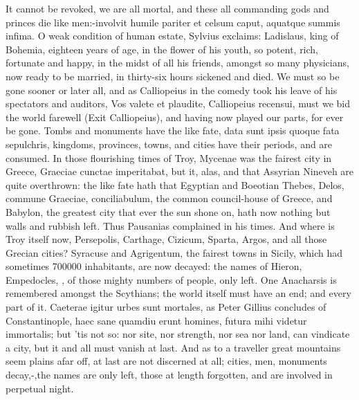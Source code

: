 {It cannot be revoked, we are all mortal, and these all commanding gods
and princes die like men:-involvit humile pariter et celsum
caput, aquatque summis infima. O weak condition of human estate,
Sylvius exclaims: Ladislaus, king of Bohemia, eighteen years of
age, in the flower of his youth, so potent, rich, fortunate and happy,
in the midst of all his friends, amongst so many physicians, now
ready to be  married, in thirty-six hours sickened and died. We
must so be gone sooner or later all, and as Calliopeius in the comedy
took his leave of his spectators and auditors, Vos valete et plaudite,
Calliopeius recensui, must we bid the world farewell (Exit
Calliopeius), and having now played our parts, for ever be gone. Tombs
and monuments have the like fate, data sunt ipsis quoque fata
sepulchris, kingdoms, provinces, towns, and cities have their periods,
and are consumed. In those flourishing times of Troy, Mycenae was the
fairest city in Greece, Graeciae cunctae imperitabat, but it, alas, and
that Assyrian Nineveh are quite overthrown: the like fate hath
that Egyptian and Boeotian Thebes, Delos, commune Graeciae,
conciliabulum, the common council-house of Greece, and Babylon,
the greatest city that ever the sun shone on, hath now nothing but
walls and rubbish left.  Thus Pausanias complained in his times. And where is
Troy itself now, Persepolis, Carthage, Cizicum, Sparta, Argos, and all
those Grecian cities? Syracuse and Agrigentum, the fairest towns in
Sicily, which had sometimes 700\thinspace{}000 inhabitants, are now decayed: the
names of Hieron, Empedocles, \etc{}, of those mighty numbers of people,
only left. One Anacharsis is remembered amongst the Scythians; the
world itself must have an end; and every part of it. Caeterae igitur
urbes sunt mortales, as Peter Gillius concludes of
Constantinople, haec sane quamdiu erunt homines, futura mihi videtur
immortalis; but 'tis not so: nor site, nor strength, nor sea nor land,
can vindicate a city, but it and all must vanish at last. And as to a
traveller great mountains seem plains afar off, at last are not
discerned at all; cities, men, monuments decay,-,the names are only left, those at length
forgotten, and are involved in perpetual night.

}
